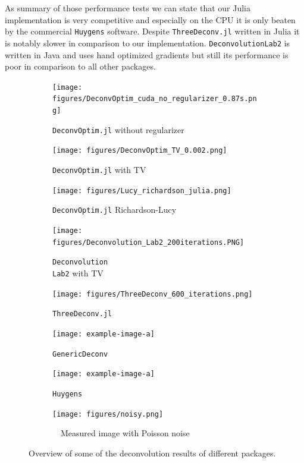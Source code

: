 \documentclass{juliacon}
\begin{document}
        As summary of those performance tests we can state that our Julia implementation is very competitive and especially on the CPU it is only
        beaten by the commercial \verb|Huygens| software. Despite \verb|ThreeDeconv.jl| written in Julia 
        it is notably slower in comparison to our implementation.
        \verb|DeconvolutionLab2| is written in Java and uses hand optimized gradients but still its performance is poor in comparison to all
        other packages.
        \begin{figure}[h]
            \begin{subfigure}{.3\textwidth}
                \centering
                \texttt{[image: figures/DeconvOptim\_cuda\_no\_regularizer\_0.87s.png]}
                \caption{\texttt{DeconvOptim.jl} without regularizer}
            \end{subfigure}
            \begin{subfigure}{.3\textwidth}
                \centering
                \texttt{[image: figures/DeconvOptim\_TV\_0.002.png]}
                \caption{\texttt{DeconvOptim.jl} with TV}
            \end{subfigure}
            \begin{subfigure}{.3\textwidth}
                \centering
                \texttt{[image: figures/Lucy\_richardson\_julia.png]}
                \caption{\texttt{DeconvOptim.jl} Richardson-Lucy}
            \end{subfigure}
            \begin{subfigure}{.3\textwidth}
                \centering
                \texttt{[image: figures/Deconvolution\_Lab2\_200iterations.PNG]}
                \caption{\texttt{Deconvolution\\Lab2} with TV}
            \end{subfigure}
            \begin{subfigure}{.3\textwidth}
                \centering
                \texttt{[image: figures/ThreeDeconv\_600\_iterations.png]}
                \caption{\texttt{ThreeDeconv.jl}}
            \end{subfigure}
            \begin{subfigure}{.3\textwidth}
                \centering
                \texttt{[image: example-image-a]}
                \caption{\texttt{GenericDeconv}}
            \end{subfigure}
            \begin{subfigure}{.3\textwidth}
                \centering
                \texttt{[image: example-image-a]}
                \caption{\texttt{Huygens}}
            \end{subfigure}
            \begin{subfigure}{.3\textwidth}
                \centering
                \texttt{[image: figures/noisy.png]}
                \caption{~~Measured image with Poisson noise}
            \end{subfigure}
            \caption{Overview of some of the deconvolution results of different packages.}
            \label{img:results}
        \end{figure} 
\end{document}

